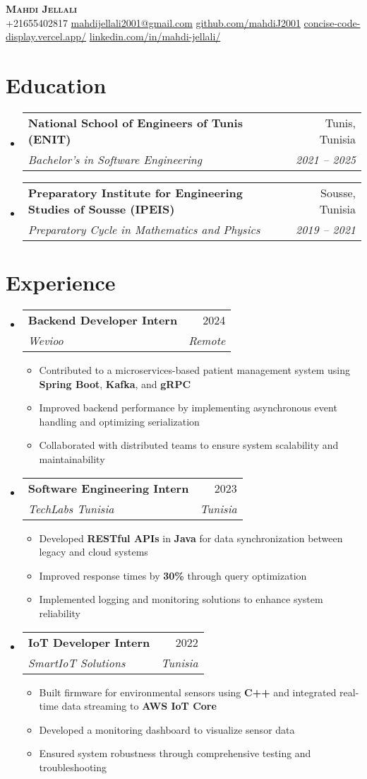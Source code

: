 \documentclass[letterpaper,11pt]{article}
\makeatletter
\newcommand{\resumeItem}[1]{
    \item\small{
            {#1 \vspace{-2pt}}
    }
}
\newcommand{\resumeSubheading}[4]{
    \vspace{-2pt}\item
    \begin{tabular*}{0.97\textwidth}[t]{l@{\extracolsep{\fill}}r}
    \textbf{#1} & #2 \\
    \textit{\small#3} & \textit{\small #4} \\
    \end{tabular*}\vspace{-7pt}
}
\newcommand{\resumeSubHeadingListStart}{\begin{itemize}[leftmargin=0.15in, label={}]}
\newcommand{\resumeSubHeadingListEnd}{\end{itemize}}
\newcommand{\resumeItemListStart}{\begin{itemize}}
\newcommand{\resumeItemListEnd}{\end{itemize}\vspace{-5pt}}
\makeatother
\begin{document}
\begin{center}
\textbf{\Huge \scshape Mahdi Jellali} \\ \vspace{1pt}
\small
+21655402817 \quad
\href{mailto:mahdijellali2001@gmail.com}{mahdijellali2001@gmail.com} \quad
\href{https://github.com/mahdiJ2001}{github.com/mahdiJ2001} \quad
\href{https://concise-code-display.vercel.app/}{concise-code-display.vercel.app/} \quad
\href{https://www.linkedin.com/in/mahdi-jellali/}{linkedin.com/in/mahdi-jellali/}
\end{center}

\vspace{10pt}
\section{Education}
\resumeSubHeadingListStart
\resumeSubheading
{National School of Engineers of Tunis (ENIT)}{Tunis, Tunisia}
{Bachelor’s in Software Engineering}{2021 -- 2025}
\resumeSubheading
{Preparatory Institute for Engineering Studies of Sousse (IPEIS)}{Sousse, Tunisia}
{Preparatory Cycle in Mathematics and Physics}{2019 -- 2021}
\resumeSubHeadingListEnd

\section{Experience}
\resumeSubHeadingListStart
\resumeSubheading
{Backend Developer Intern}{2024}
{Wevioo}{ Remote}
\resumeItemListStart
\resumeItem{Contributed to a microservices-based patient management system using \textbf{Spring Boot}, \textbf{Kafka}, and \textbf{gRPC}}
\resumeItem{Improved backend performance by implementing asynchronous event handling and optimizing serialization}
\resumeItem{Collaborated with distributed teams to ensure system scalability and maintainability}
\resumeItemListEnd
\resumeSubheading
{Software Engineering Intern}{2023}
{TechLabs Tunisia}{Tunisia}
\resumeItemListStart
\resumeItem{Developed \textbf{RESTful APIs} in \textbf{Java} for data synchronization between legacy and cloud systems}
\resumeItem{Improved response times by \textbf{30\%} through query optimization}
\resumeItem{Implemented logging and monitoring solutions to enhance system reliability}
\resumeItemListEnd
\resumeSubheading
{IoT Developer Intern}{2022}
{SmartIoT Solutions}{Tunisia}
\resumeItemListStart
\resumeItem{Built firmware for environmental sensors using \textbf{C++} and integrated real-time data streaming to \textbf{AWS IoT Core}}
\resumeItem{Developed a monitoring dashboard to visualize sensor data}
\resumeItem{Ensured system robustness through comprehensive testing and troubleshooting}
\resumeItemListEnd
\resumeSubHeadingListEnd
\end{document}
